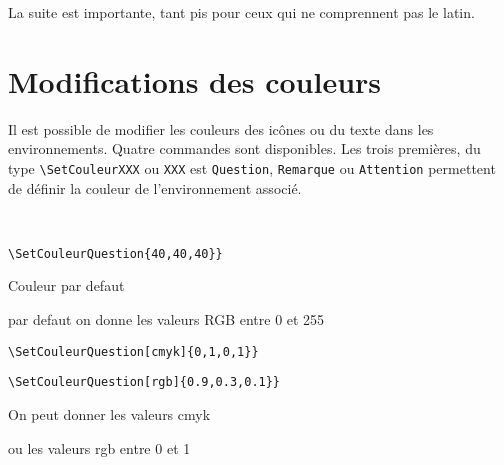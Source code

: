 \documentclass[12pt]{article}
\begin{document}
\lipsum[3]

\begin{attention}
    La suite est importante, tant pis pour ceux qui ne comprennent pas le latin.
\end{attention}

\lipsum[4]

\section{Modifications des couleurs}

Il est possible de modifier les
couleurs des icônes ou du texte dans les environnements. Quatre commandes sont
disponibles. Les trois premières, du type \verb!\SetCouleurXXX! ou \verb!XXX! est
\verb!Question!, \verb!Remarque! ou \verb!Attention! permettent de définir la couleur de
l'environnement associé.

\begin{minipage}{0.49\textwidth}
    ~
\end{minipage}
\begin{minipage}{0.49\textwidth}
    \footnotesize\verb!\SetCouleurQuestion{40,40,40}}!
\end{minipage}

\begin{minipage}{0.49\textwidth}
    \begin{question}
        Couleur par defaut
    \end{question}
\end{minipage}
\begin{minipage}{0.49\textwidth}
    \begin{question}
        par defaut on donne les valeurs RGB entre 0 et 255
    \end{question}
\end{minipage}

\begin{minipage}{0.49\textwidth}
    \footnotesize\verb!\SetCouleurQuestion[cmyk]{0,1,0,1}}!
\end{minipage}
\begin{minipage}{0.49\textwidth}
    \footnotesize\verb!\SetCouleurQuestion[rgb]{0.9,0.3,0.1}}!
\end{minipage}

\begin{minipage}{0.49\textwidth}
    \begin{question}
        On peut donner les valeurs cmyk
    \end{question}
\end{minipage}
\begin{minipage}{0.49\textwidth}
    \begin{question}
        ou les valeurs rgb entre 0 et 1
    \end{question}
\end{minipage}
\end{document}
